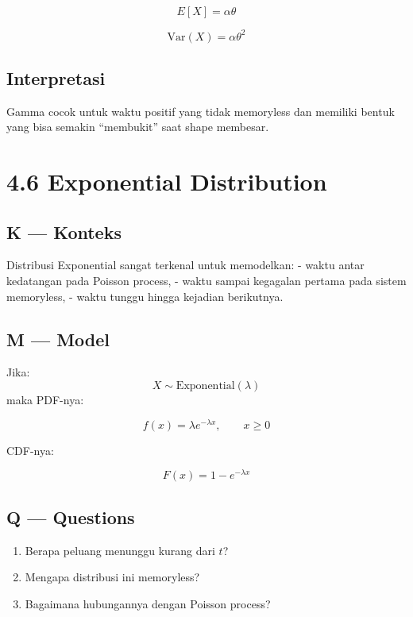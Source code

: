 \documentclass[
  letterpaper,
  DIV=11,
  numbers=noendperiod]{scrreprt}
\providecommand{\tightlist}{%
  \setlength{\itemsep}{0pt}\setlength{\parskip}{0pt}}
\begin{document}
\[
E[X]=\alpha\theta
\]

\[
\mathrm{Var}(X)=\alpha\theta^2
\]

\subsection{Interpretasi}\label{interpretasi-11}

Gamma cocok untuk waktu positif yang tidak memoryless dan memiliki
bentuk yang bisa semakin ``membukit'' saat shape membesar.

\section{4.6 Exponential Distribution}\label{exponential-distribution}

\subsection{K --- Konteks}\label{k-konteks-23}

Distribusi Exponential sangat terkenal untuk memodelkan: - waktu antar
kedatangan pada Poisson process, - waktu sampai kegagalan pertama pada
sistem memoryless, - waktu tunggu hingga kejadian berikutnya.

\subsection{M --- Model}\label{m-model-23}

Jika: \[
X \sim \mathrm{Exponential}(\lambda)
\] maka PDF-nya:

\[
f(x)=\lambda e^{-\lambda x}, \qquad x \ge 0
\]

CDF-nya:

\[
F(x)=1-e^{-\lambda x}
\]

\subsection{Q --- Questions}\label{q-questions-23}

\begin{enumerate}
\def\labelenumi{\arabic{enumi}.}
\tightlist
\item
  Berapa peluang menunggu kurang dari \(t\)?
\item
  Mengapa distribusi ini memoryless?
\item
  Bagaimana hubungannya dengan Poisson process?
\end{enumerate}
\end{document}
